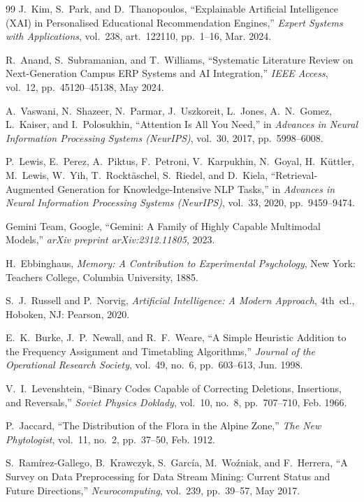 \documentclass[11pt,a4paper]{article}
\begin{document}
\begin{thebibliography}{99}
J.~Kim, S.~Park, and D.~Thanopoulos, ``Explainable Artificial Intelligence (XAI) in Personalised Educational Recommendation Engines,'' \emph{Expert Systems with Applications}, vol.~238, art.~122110, pp.~1--16, Mar. 2024.

R.~Anand, S.~Subramanian, and T.~Williams, ``Systematic Literature Review on Next-Generation Campus ERP Systems and AI Integration,'' \emph{IEEE Access}, vol.~12, pp.~45120--45138, May 2024.

A.~Vaswani, N.~Shazeer, N.~Parmar, J.~Uszkoreit, L.~Jones, A.~N.~Gomez, L.~Kaiser, and I.~Polosukhin, ``Attention Is All You Need,'' in \emph{Advances in Neural Information Processing Systems (NeurIPS)}, vol.~30, 2017, pp.~5998--6008.

P.~Lewis, E.~Perez, A.~Piktus, F.~Petroni, V.~Karpukhin, N.~Goyal, H.~Küttler, M.~Lewis, W.~Yih, T.~Rocktäschel, S.~Riedel, and D.~Kiela, ``Retrieval-Augmented Generation for Knowledge-Intensive NLP Tasks,'' in \emph{Advances in Neural Information Processing Systems (NeurIPS)}, vol.~33, 2020, pp.~9459--9474.

Gemini Team, Google, ``Gemini: A Family of Highly Capable Multimodal Models,'' \emph{arXiv preprint arXiv:2312.11805}, 2023.

H.~Ebbinghaus, \emph{Memory: A Contribution to Experimental Psychology}, New York: Teachers College, Columbia University, 1885.

S.~J.~Russell and P.~Norvig, \emph{Artificial Intelligence: A Modern Approach}, 4th~ed., Hoboken, NJ: Pearson, 2020.

E.~K.~Burke, J.~P.~Newall, and R.~F.~Weare, ``A Simple Heuristic Addition to the Frequency Assignment and Timetabling Algorithms,'' \emph{Journal of the Operational Research Society}, vol.~49, no.~6, pp.~603--613, Jun. 1998.

V.~I.~Levenshtein, ``Binary Codes Capable of Correcting Deletions, Insertions, and Reversals,'' \emph{Soviet Physics Doklady}, vol.~10, no.~8, pp.~707--710, Feb. 1966.

P.~Jaccard, ``The Distribution of the Flora in the Alpine Zone,'' \emph{The New Phytologist}, vol.~11, no.~2, pp.~37--50, Feb. 1912.

S.~Ramírez-Gallego, B.~Krawczyk, S.~García, M.~Woźniak, and F.~Herrera, ``A Survey on Data Preprocessing for Data Stream Mining: Current Status and Future Directions,'' \emph{Neurocomputing}, vol.~239, pp.~39--57, May 2017.


\end{thebibliography}
\end{document}
